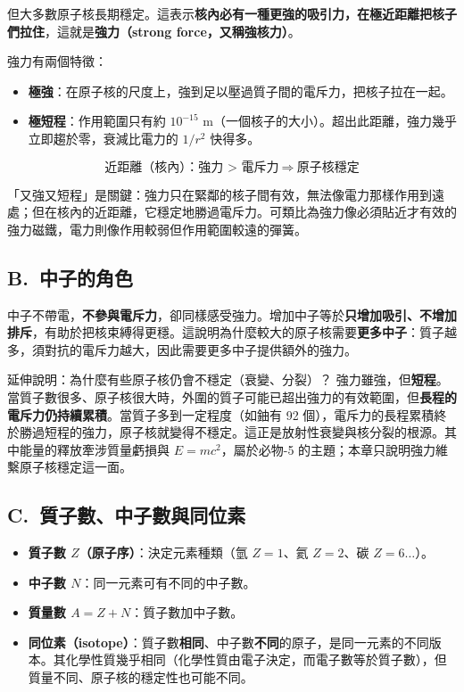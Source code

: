 \documentclass[11pt]{article}
\begin{document}
但大多數原子核長期穩定。這表示\textbf{核內必有一種更強的吸引力，在極近距離把核子們拉住}，這就是\textbf{強力（strong force，又稱強核力）}。


強力有兩個特徵：
\begin{itemize}\setlength{\itemsep}{1pt}
\item \textbf{極強}：在原子核的尺度上，強到足以壓過質子間的電斥力，把核子拉在一起。
\item \textbf{極短程}：作用範圍只有約 $10^{-15}$ m（一個核子的大小）。超出此距離，強力幾乎立即趨於零，衰減比電力的 $1/r^2$ 快得多。
\end{itemize}

$$\boxed{\;\text{近距離（核內）：強力 > 電斥力}\ \Rightarrow\ \text{原子核穩定}\;}$$

「又強又短程」是關鍵：強力只在緊鄰的核子間有效，無法像電力那樣作用到遠處；但在核內的近距離，它穩定地勝過電斥力。可類比為強力像必須貼近才有效的強力磁鐵，電力則像作用較弱但作用範圍較遠的彈簧。

\subsection*{\sffamily B.\ 中子的角色}

中子不帶電，\textbf{不參與電斥力}，卻同樣感受強力。增加中子等於\textbf{只增加吸引、不增加排斥}，有助於把核束縛得更穩。這說明為什麼較大的原子核需要\textbf{更多中子}：質子越多，須對抗的電斥力越大，因此需要更多中子提供額外的強力。

\begin{補充框}{延伸說明：為什麼有些原子核仍會不穩定（衰變、分裂）？}
強力雖強，但\textbf{短程}。當質子數很多、原子核很大時，外圍的質子可能已超出強力的有效範圍，但\textbf{長程的電斥力仍持續累積}。當質子多到一定程度（如鈾有 92 個），電斥力的長程累積終於勝過短程的強力，原子核就變得不穩定。這正是放射性衰變與核分裂的根源。其中能量的釋放牽涉質量虧損與 $E=mc^2$，屬於必物-5 的主題；本章只說明強力維繫原子核穩定這一面。
\end{補充框}

\subsection*{\sffamily C.\ 質子數、中子數與同位素}

\begin{itemize}\setlength{\itemsep}{1pt}
\item \textbf{質子數 $Z$（原子序）}：決定元素種類（氫 $Z=1$、氦 $Z=2$、碳 $Z=6$$\dots$）。
\item \textbf{中子數 $N$}：同一元素可有不同的中子數。
\item \textbf{質量數 $A=Z+N$}：質子數加中子數。
\item \textbf{同位素（isotope）}：質子數\textbf{相同}、中子數\textbf{不同}的原子，是同一元素的不同版本。其化學性質幾乎相同（化學性質由電子決定，而電子數等於質子數），但質量不同、原子核的穩定性也可能不同。
\end{itemize}
\end{document}
